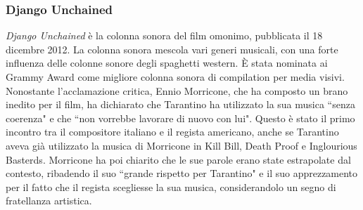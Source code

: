 \documentclass[12pt]{article} %
\begin{document}
                    \subsubsection*{Django Unchained}
                    \begin{flushleft}
                        \textit{Django Unchained} è la colonna sonora del film omonimo, pubblicata il 18 dicembre 2012. La colonna sonora mescola vari generi musicali, con una forte influenza delle colonne sonore degli spaghetti western. È stata nominata ai Grammy Award come migliore colonna sonora di compilation per media visivi. Nonostante l'acclamazione critica, Ennio Morricone, che ha composto un brano inedito per il film, ha dichiarato che Tarantino ha utilizzato la sua musica ``senza coerenza" e che ``non vorrebbe lavorare di nuovo con lui". Questo è stato il primo incontro tra il compositore italiano e il regista americano, anche se Tarantino aveva già utilizzato la musica di Morricone in Kill Bill, Death Proof e Inglourious Basterds. Morricone ha poi chiarito che le sue parole erano state estrapolate dal contesto, ribadendo il suo ``grande rispetto per Tarantino" e il suo apprezzamento per il fatto che il regista scegliesse la sua musica, considerandolo un segno di fratellanza artistica.
                    \end{flushleft}
                        \small
\end{document}
